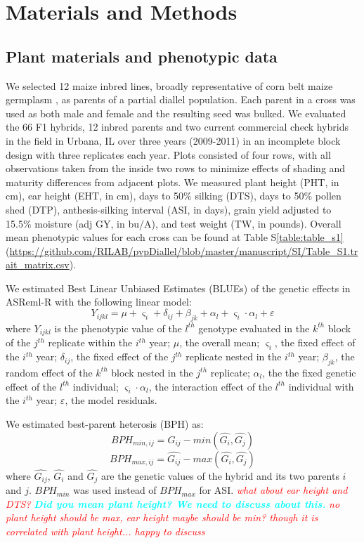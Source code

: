 \documentclass[9pt,twocolumn,twoside]{gsajnl}
\newcommand{\yang}[1]{\textcolor{cyan}{\emph{\bf  #1}} }
\newcommand{\jri}[1]{\textcolor{red}{ \emph{ #1}} }
\begin{document}
\section*{Materials and Methods} 

\subsection*{Plant materials and phenotypic data}
We selected 12 maize inbred lines, broadly representative of corn belt maize germplasm \citep{mikel2006evolution}, as parents of a partial diallel population. 
Each parent in a cross was used as both male and female and the resulting seed was bulked. 
We evaluated the 66 F1 hybrids, 12 inbred parents and two current commercial check hybrids in the field in Urbana, IL over three years (2009-2011) in an incomplete block design with three replicates each year.  
Plots consisted of four rows, with all observations taken from the inside two rows to minimize effects of shading and maturity differences from adjacent plots.  
We measured plant height (PHT, in cm), ear height (EHT, in cm), days to 50\% silking (DTS), days to 50\% pollen shed (DTP), anthesis-silking interval (ASI, in days), grain yield adjusted to 15.5\% moisture (adj GY, in bu/A), and test weight (TW, in pounds). 
Overall mean phenotypic values for each cross can be found at Table S\ref{table:table_s1} (\url{https://github.com/RILAB/pvpDiallel/blob/master/manuscript/SI/Table_S1.trait_matrix.csv}).

We estimated Best Linear Unbiased Estimates (BLUEs) of the genetic effects in ASReml-R \citep{gilmour2009asreml} with the following linear model: 
%
\[Y_{ijkl} = \mu + \varsigma_{i} + \delta_{ij} + \beta_{jk} + \alpha_{l} +  \varsigma_{i} \cdot \alpha_{l} + \varepsilon\]
%
where 
$Y_{ijkl}$ is the phenotypic value of the $l^{th}$ genotype evaluated in the $k^{th}$ block of the $j^{th}$ replicate within the $i^{th}$ year; 
$\mu$, the overall mean; 
$\varsigma_{i}$, the fixed effect of the $i^{th}$ year;
$\delta_{ij}$, the fixed effect of the $j^{th}$ replicate nested in the $i^{th}$ year; 
$\beta_{jk}$, the random effect of the $k^{th}$ block nested in the $j^{th}$ replicate; 
$\alpha_{l}$, the the fixed genetic effect  of the $l^{th}$ individual; 
$\varsigma_{i} \cdot \alpha_{l}$, the interaction effect of the $l^{th}$ individual with the $i^{th}$ year; 
$\varepsilon$, the model residuals. 

We estimated best-parent heterosis (BPH) as:
%
\[ BPH_{min,ij}=\hat{G_{ij}}-min(\hat{G_{i}} ,\hat{G_{j}}) \] 
\[ BPH_{max,ij}=\hat{G_{ij}}-max(\hat{G_{i}} ,\hat{G_{j}}) \]
%
where $\hat{G_{ij}}$, $\hat{G_{i}}$ and $\hat{G_{j}}$ are the genetic values of the hybrid and its two parents $i$ and $j$. $BPH_{min}$ was used instead of $BPH_{max}$ for ASI. \jri{what about ear height and DTS?} \yang{Did you mean plant height? We need to discuss about this.} \jri{no plant height should be max, ear height maybe should be min? though it is correlated with plant height... happy to discuss}
\end{document}

